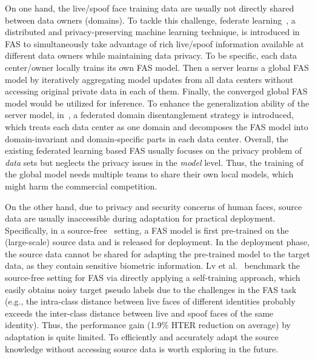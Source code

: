 \documentclass[10pt,journal,compsoc]{IEEEtran}
\begin{document}
On one hand, the live/spoof face training data are usually not directly shared between data owners (domains). To tackle this challenge, federate learning~\cite{mcmahan2017communication}, a distributed and privacy-preserving machine learning technique, is introduced in FAS to simultaneously take advantage of rich live/spoof information available at different data owners while maintaining data privacy. To be specific, each data center/owner locally trains its own FAS model. Then a server learns a global FAS model by iteratively aggregating model updates from all data centers without accessing original private data in each of them. Finally, the converged global FAS model would be utilized for inference. To enhance the generalization ability of the server model, in~\cite{shao2021federated}, a federated domain disentanglement strategy is introduced, which treats each data center as one domain and decomposes the FAS model into domain-invariant and domain-specific parts in each data center. Overall, the existing federated learning based FAS usually focuses on the privacy problem of \textit{data} sets but neglects the privacy issues in the \textit{model} level. Thus, the training of the global model needs multiple teams to share their own local models, which might harm the commercial competition.   


On the other hand, due to privacy and security concerns of human faces, source data are usually inaccessible during adaptation for practical deployment. Specifically, in a source-free~\cite{kundu2020universal} setting, a FAS model is first pre-trained on the (large-scale) source data and is released for deployment. In the deployment phase, the source data cannot be shared for adapting the pre-trained model to the target data, as they contain sensitive biometric information. Lv et al.~\cite{lv2021combining} benchmark the source-free setting for FAS via directly applying a self-training approach, which easily obtains noisy target pseudo labels due to the challenges in the FAS task (e.g., the intra-class distance between live faces of different identities probably exceeds the inter-class distance between live and spoof faces of the same identity). Thus, the performance gain (1.9\% HTER reduction on average) by adaptation is quite limited. To efficiently and accurately adapt the source knowledge without accessing source data is worth exploring in the future.  



\end{document}
